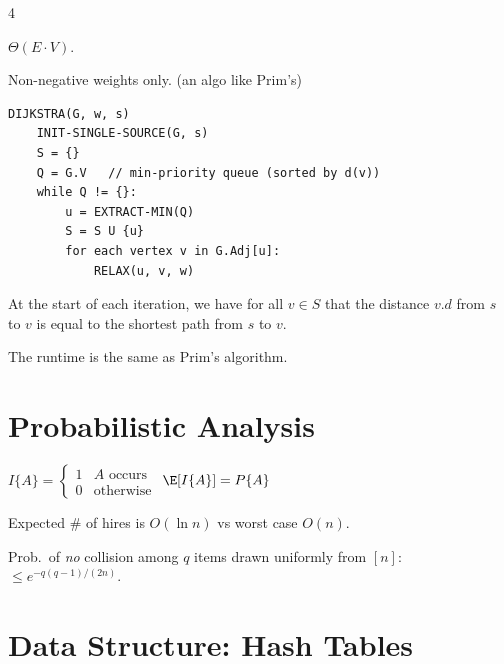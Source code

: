 \documentclass[8pt,a4paper,landscape]{extarticle}
\begin{document}
\begin{multicols*}{4}
\begin{prop}[title=Runtime]
$\Theta(E\cdot V)$.
\end{prop}

Non-negative weights only. (an algo like Prim's)

\begin{lstlisting}
DIJKSTRA(G, w, s)
    INIT-SINGLE-SOURCE(G, s)
    S = {}
    Q = G.V   // min-priority queue (sorted by d(v))
    while Q != {}:
        u = EXTRACT-MIN(Q)
        S = S U {u}
        for each vertex v in G.Adj[u]:
            RELAX(u, v, w)
\end{lstlisting}

\begin{thm}[title=Loop invariant (correctness)]
At the start of each iteration, we have for all $v \in S$ that the distance $v.d$ from $s$ to $v$ is equal to the shortest path from $s$ to $v$.
\end{thm}

\begin{prop}[title=Runtime]
The runtime is the same as Prim's algorithm.
\end{prop}

\section{Probabilistic Analysis}

\begin{defn}[title=Indicator RV]
$I\{A\} = \begin{cases}1 & A\text{ occurs}\\0 & \text{otherwise}\end{cases}$ \quad $\E[I\{A\}] = P\{A\}$
\end{defn}

\begin{prop}[title=Hiring Problem]
Expected $\#$ of hires is $O(\ln n)$ vs worst case $O(n)$.
\end{prop}

\begin{prop}[title=Birthday lemma]
Prob.\ of \emph{no} collision among $q$ items drawn uniformly from $[n]$:
$\leq e^{-q(q-1)/(2n)}$.
\end{prop}

\section{Data Structure: Hash Tables}


\end{multicols*}
\end{document}
